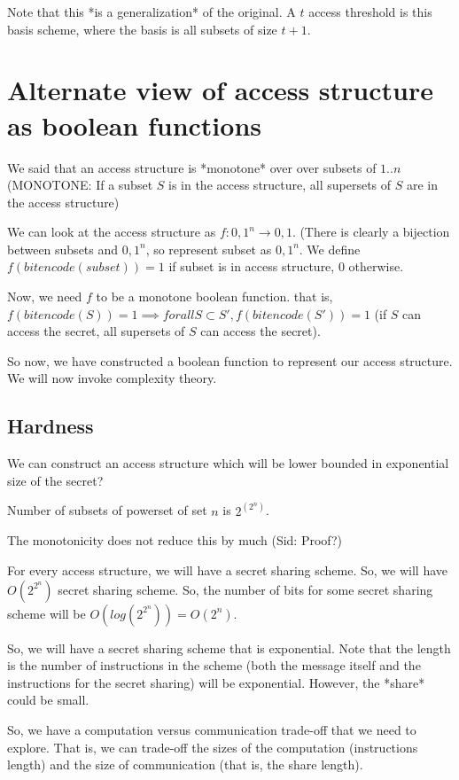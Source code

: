 Note that this *is a generalization* of the original. A $t$ access threshold is
this basis scheme, where the basis is all subsets of size $t + 1$.


\section{Alternate view of access structure as boolean functions}
We said that an access structure is *monotone* over over subsets of ${1..n}$ 
(MONOTONE: If a subset $S$ is in the access structure, all supersets of $S$
are in the access structure)


We can look at the access structure as $f: {0, 1}^n \rightarrow {0, 1}$. (There
is clearly a bijection between subsets and ${0, 1}^n$, so represent subset as
${0, 1}^n$. We define  $f(bitencode(subset)) = 1$ if subset is in access structure, $0$ otherwise.


Now, we need $f$ to be a monotone boolean function. that is,
$f(bitencode(S)) = 1 \implies forall S \subset S', f(bitencode(S')) = 1$ (if $S$ can access the secret,
all supersets of $S$ can access the secret).

So now, we have constructed a boolean function to represent our access structure.
We will now invoke complexity theory.

\subsection{Hardness}
We can construct an access structure which will be lower bounded in exponential
size of the secret?

Number of subsets of powerset of set $n$ is $2^(2^n)$.
 
The monotonicity does not reduce this by much (Sid: Proof?)

For every access structure, we will have a secret sharing scheme. So, we will
have $O(2^{2^n})$ secret sharing scheme. So, the number of bits for some
secret sharing scheme will be $O(log(2^{2^n})) = O(2^n)$.


So, we will  have a secret sharing scheme that is exponential. Note that
the length is the number of instructions in the scheme  (both the message itself
and the instructions for the secret sharing) will be exponential. However, the
*share* could be small.

So, we have a computation versus communication trade-off that we need to explore.
That is, we can trade-off the sizes of the computation (instructions length)
and the size of communication (that is, the share length).




